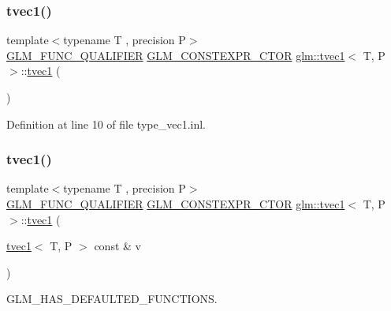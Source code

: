 \subsubsection{\texorpdfstring{tvec1()}{tvec1()}\hspace{0.1cm}{\footnotesize\ttfamily [1/14]}}
{\footnotesize\ttfamily template$<$typename T , precision P$>$ \\
\mbox{\hyperlink{setup_8hpp_a33fdea6f91c5f834105f7415e2a64407}{G\+L\+M\+\_\+\+F\+U\+N\+C\+\_\+\+Q\+U\+A\+L\+I\+F\+I\+ER}} \mbox{\hyperlink{setup_8hpp_ad34178a09666081abdb573c14d1f4a5a}{G\+L\+M\+\_\+\+C\+O\+N\+S\+T\+E\+X\+P\+R\+\_\+\+C\+T\+OR}} \mbox{\hyperlink{structglm_1_1tvec1}{glm\+::tvec1}}$<$ T, P $>$\+::\mbox{\hyperlink{structglm_1_1tvec1}{tvec1}} (\begin{DoxyParamCaption}{ }\end{DoxyParamCaption})}



Definition at line 10 of file type\+\_\+vec1.\+inl.

\mbox{\label{structglm_1_1tvec1_a9a88135965c637f0926c293a039aedaa}} 
\subsubsection{\texorpdfstring{tvec1()}{tvec1()}\hspace{0.1cm}{\footnotesize\ttfamily [2/14]}}
{\footnotesize\ttfamily template$<$typename T , precision P$>$ \\
\mbox{\hyperlink{setup_8hpp_a33fdea6f91c5f834105f7415e2a64407}{G\+L\+M\+\_\+\+F\+U\+N\+C\+\_\+\+Q\+U\+A\+L\+I\+F\+I\+ER}} \mbox{\hyperlink{setup_8hpp_ad34178a09666081abdb573c14d1f4a5a}{G\+L\+M\+\_\+\+C\+O\+N\+S\+T\+E\+X\+P\+R\+\_\+\+C\+T\+OR}} \mbox{\hyperlink{structglm_1_1tvec1}{glm\+::tvec1}}$<$ T, P $>$\+::\mbox{\hyperlink{structglm_1_1tvec1}{tvec1}} (\begin{DoxyParamCaption}\item[{\mbox{\hyperlink{structglm_1_1tvec1}{tvec1}}$<$ T, P $>$ const \&}]{v }\end{DoxyParamCaption})}



G\+L\+M\+\_\+\+H\+A\+S\+\_\+\+D\+E\+F\+A\+U\+L\+T\+E\+D\+\_\+\+F\+U\+N\+C\+T\+I\+O\+NS. 



